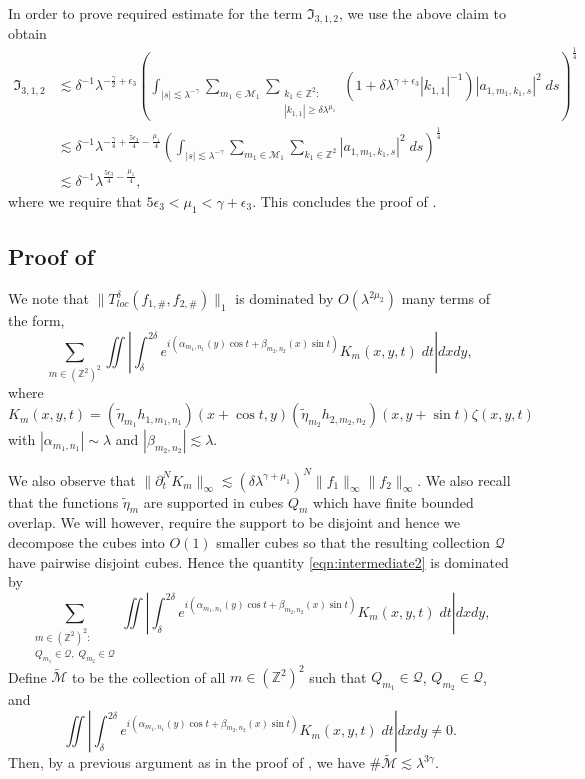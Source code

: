 \documentclass[a4paper,reqno]{amsart}
\theoremstyle{definition}
\theoremstyle{remark}
\numberwithin{equation}{section}
\newcommand{\Q}{{\mathbb Q}}
\newcommand{\Z}{{\mathbb Z}}
\begin{document}
	In order to prove required estimate for the term $\mathfrak{I}_{3,1,2}$, we use the above claim to obtain
	\begin{align*}
		\mathfrak{I}_{3,1,2}&\lesssim\delta^{-1}\lambda^{-\frac{\gamma}{2}+\epsilon_3}\left(\int_{|s|\lesssim\lambda^{-\gamma}}\sum_{m_1\in\mathcal{M}_1}\sum_{\substack{k_1\in\Z^2:\\|k_{1,1}|\geq\delta\lambda^{\mu_1}}}(1+\delta\lambda^{\gamma+\epsilon_3}|k_{1,1}|^{-1})|a_{1,m_1,k_1,s}|^2\;ds\right)^\frac{1}{4}\\
		&\lesssim\delta^{-1}\lambda^{-\frac{\gamma}{4}+\frac{5\epsilon_3}{4}-\frac{\mu_1}{4}}\left(\int_{|s|\lesssim\lambda^{-\gamma}}\sum_{m_1\in\mathcal{M}_1}\sum_{k_1\in\Z^2}|a_{1,m_1,k_1,s}|^2\;ds\right)^\frac{1}{4}\\
		&\lesssim\delta^{-1}\lambda^{\frac{5\epsilon_3}{4}-\frac{\mu_1}{4}},
	\end{align*}
	where we require that $5\epsilon_3<\mu_1<\gamma+\epsilon_3$.
	This concludes the proof of .
	
	\subsection{Proof of }\label{sec:reductiontosublevel}
	We note that $\|T^\delta_{loc}(f_{1,\#},f_{2,\#})\|_1$ is dominated by $O(\lambda^{2\mu_2})$ many terms of the form,
	\begin{equation}\label{eqn:intermediate2}
		\sum_{{m}\in(\Z^2)^2}\iint\left|\int_\delta^{2\delta}e^{i(\alpha_{m_1,n_1}(y)\cos t+\beta_{m_2,n_2}(x)\sin t)}K_{{m}}(x,y,t)\;dt\right|dxdy,
	\end{equation}
	where $K_{{m}}(x,y,t)=(\tilde\eta_{m_1}h_{1,m_1,n_1})(x+\cos t,y)(\tilde\eta_{m_2}h_{2,m_2,n_2})(x,y+\sin t)\zeta(x,y,t)$ with $|\alpha_{m_1,n_1}|\sim\lambda$ and $|\beta_{m_2,n_2}|\lesssim\lambda$.
	
	We also observe that $\|\partial_t^N K_{{m}}\|_\infty\lesssim(\delta\lambda^{\gamma+\mu_1})^N\|f_1\|_\infty\|f_2\|_\infty$. We also recall that the functions $\tilde\eta_m$ are supported in cubes $Q_m$ which have finite bounded overlap. We will however, require the support to be disjoint and hence we decompose the cubes into $O(1)$ smaller cubes so that the resulting collection $\mathcal{Q}$ have pairwise disjoint cubes. Hence the quantity \eqref{eqn:intermediate2} is dominated by
	\begin{equation*}
		\sum_{\substack{{m}\in(\Z^2)^2:\\Q_{m_1}\in\mathcal{Q},\;Q_{m_2}\in\mathcal{Q}}}\iint\left|\int_\delta^{2\delta}e^{i(\alpha_{m_1,n_1}(y)\cos t+\beta_{m_2,n_2}(x)\sin t)}K_{{m}}(x,y,t)\;dt\right|dxdy,
	\end{equation*}
	Define $\widetilde{\mathcal{M}}$ to be the collection of all ${m}\in(\Z^2)^2$ such that $Q_{m_1}\in\mathcal{Q}$, $Q_{m_2}\in\mathcal{Q}$, and 
	\[\iint\left|\int_\delta^{2\delta}e^{i(\alpha_{m_1,n_1}(y)\cos t+\beta_{m_2,n_2}(x)\sin t)}K_{{m}}(x,y,t)\;dt\right|dxdy\neq0.\]
	Then, by a previous argument as in the proof of , we have $\#\mathcal{\widetilde M}\lesssim\lambda^{3\gamma}$.
	
\end{document}
